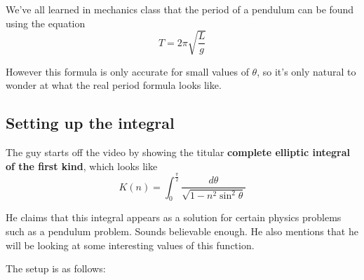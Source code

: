 \documentclass[11pt]{article}
\begin{document}
\vspace{10mm}\begin{minipage}{6cm}
We've all learned in mechanics class that the period of a pendulum can be found using the equation
$$T=2\pi\sqrt{\dfrac{L}{g}}$$
\end{minipage} \quad
{}

\vspace{5mm}However this formula is only accurate for small values of $\theta$, so it's only natural to wonder at what the real period formula looks like.

\subsection{Setting up the integral}
The guy starts off the video by showing the titular \textbf{complete elliptic integral of the first kind}, which looks like
$$K(n)=\int_0^{\frac{\pi}{2}}\frac{d\theta}{\sqrt{1-n^2\sin^2\theta}}$$

He claims that this integral appears as a solution for certain physics problems such as a pendulum problem. Sounds believable enough. He also mentions that he will be looking at some interesting values of this function.

\vspace{5mm} The setup is as follows:

\begin{center}
\end{center}
\end{document}
